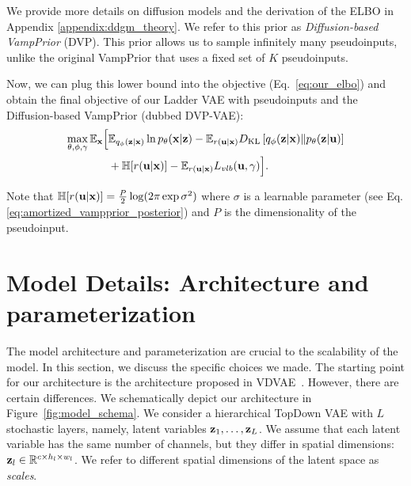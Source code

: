 We provide more details on diffusion models and the derivation of the ELBO in Appendix \ref{appendix:ddgm_theory}. We refer to this prior as \textit{Diffusion-based VampPrior} (DVP). This prior allows us to sample infinitely many pseudoinputs, unlike the original VampPrior that uses a fixed set of $K$ pseudoinputs.

Now, we can plug this lower bound into the objective (Eq.~\ref{eq:our_elbo}) and obtain the final objective of our Ladder VAE with pseudoinputs and the Diffusion-based VampPrior (dubbed DVP-VAE):
\begin{equation}\label{eq:5_dvp_our_elbo_final}
\begin{aligned}
    \max_{\theta, \phi, \gamma}\E_{\rvx} \Bigl[
     &\E_{\Enc{\rvz}{\rvx}} \ln \Dec{\rvx}{\rvz} 
     - \E_{r(\rvu|\rvx)}\KL{q_{\phi}(\rvz|\rvx)}{p_{\theta}(\rvz|\rvu)} \\
     &+ \mathbb{H}[r(\rvu|\rvx)] 
     - \E_{r(\rvu|\rvx)} L_{vlb}(\rvu, \gamma)\Bigr].
\end{aligned}
\end{equation}


Note that $\mathbb{H}[r({\mathbf{u}}|{\mathbf{x}})] = \frac{P}{2}\log(2\pi \exp \sigma^2)$ where $\sigma$ is a learnable parameter (see Eq. \ref{eq:amortized_vampprior_posterior}) and $P$ is the dimensionality of the pseudoinput.

\section{Model Details: Architecture and parameterization} \label{sec:architecture}

The model architecture and parameterization are crucial to the scalability of the model. In this section, we discuss the specific choices we made.
The starting point for our architecture is the architecture proposed in VDVAE~\citep{Child2020-ze}. However, there are certain differences. We schematically depict our architecture in Figure~\ref{fig:model_schema}. We consider a hierarchical TopDown VAE with $L$ stochastic layers, namely, latent variables ${\mathbf{z}}_1, \dots, {\mathbf{z}}_L$. We assume that each latent variable has the same number of channels, but they differ in spatial dimensions: ${\mathbf{z}}_l \in \mathbb{R}^{c \times h_l \times w_l}$. We refer to different spatial dimensions of the latent space as \textit{scales}.

